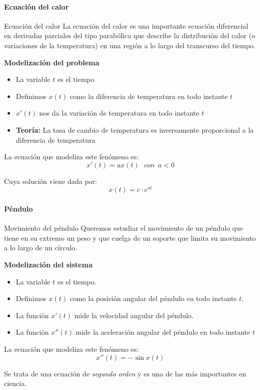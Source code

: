 \documentclass[8pt]{beamer}
\begin{document}
\begin{frame}
\framesubtitle{Ecuación del calor}

\begin{block}{Ecuación del calor}
La ecuación del calor es una importante ecuación diferencial en derivadas parciales del tipo parabólica que describe la distribución del calor (o variaciones de la temperatura) en una región a lo largo del transcurso del tiempo.
\end{block}

\textbf{Modelización del problema}
\begin{itemize}
\item La variable $t$ es el tiempo
\item Definimos $x(t)$ como la diferencia de temperatura en todo instante $t$
\item $x'(t)$ nos da la variación de temperatura en todo instante $t$
\item \textbf{Teoría:} La tasa de cambio de temperatura es inversamente proporcional a la diferencia de temperatura
\end{itemize}

La ecuación que modeliza este fenómeno es:
\begin{equation}
x'(t) = ax(t)~~~con~~ a<0
\end{equation}

Cuya solución viene dada por:
\begin{equation}
x(t) = c\cdot e^{at}
\end{equation}
\end{frame}

\begin{frame}
\framesubtitle{Péndulo}
\begin{block}{Movimiento del péndulo}
Queremos estudiar el movimiento de un péndulo que tiene en su extremo un peso y que cuelga de un soporte que limita su movimiento a lo largo de un círculo.
\end{block}

\textbf{Modelización del sistema}
\begin{itemize}
\item La variable $t$ es el tiempo.
\item Definimos $x(t)$ como la posición angular del péndulo en todo instante $t$.
\item La función $x'(t)$ mide la velocidad angular del péndulo.
\item La función $x''(t)$ mide la aceleración angular del péndulo en todo instante $t$
\end{itemize}

La ecuación que modeliza este fenómeno es:
\begin{equation}
x''(t) = -\sin x(t)
\end{equation}

Se trata de una ecuación de \emph{segundo orden} y es una de las más importantes en ciencia.
\end{frame}
\end{document}
